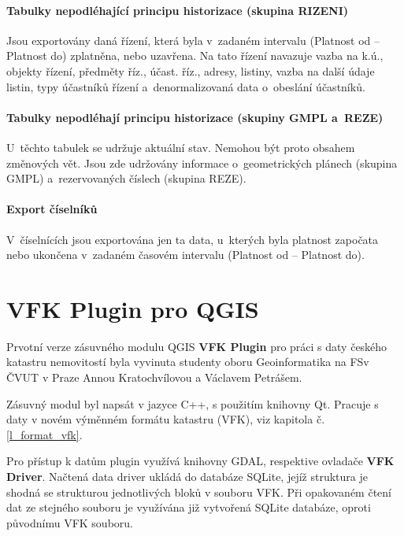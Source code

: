 \documentclass[a4paper,12pt,oneside]{book}
\begin{document}
\subsubsection{Tabulky nepodléhající principu historizace (skupina RIZENI)}

Jsou exportovány daná řízení, která byla v~zadaném intervalu (Platnost od -- Platnost do) zplatněna, nebo uzavřena. Na tato řízení navazuje vazba na k.ú., objekty řízení, předměty říz., účast. říz., adresy, listiny, vazba na další údaje listin, typy účastníků řízení a~denormalizovaná data o~obeslání účastníků. \cite{vfk_struktura}

\subsubsection{Tabulky nepodléhají principu historizace (skupiny GMPL a~REZE)}

U~těchto tabulek se udržuje aktuální stav. Nemohou být proto obsahem změnových vět. Jsou zde udržovány informace o~geometrických plánech (skupina GMPL) a~rezervovaných číslech (skupina REZE). \cite{vfk_struktura}

\subsubsection{Export číselníků}

V~číselnících jsou exportována jen ta data, u~kterých byla platnost započata nebo ukončena v~zadaném časovém intervalu (Platnost od -- Platnost do). \cite{vfk_struktura}


\clearpage
\chapter{VFK Plugin pro QGIS}
Prvotní verze zásuvného modulu QGIS \textbf{VFK Plugin} pro práci s daty českého katastru nemovitostí byla vyvinuta studenty oboru Geoinformatika na FSv ČVUT v Praze Annou Kratochvílovou a Václavem Petrášem. 

Zásuvný modul byl napsát v jazyce C++, s použitím knihovny Qt. Pracuje s daty v novém výměnném formátu katastru (VFK), viz kapitola č. \ref{l_format_vfk}. 

Pro přístup k datům plugin využívá knihovny GDAL, respektive ovladače \textbf{VFK Driver}. Načtená data driver ukládá do databáze SQLite, jejíž struktura je shodná se strukturou jednotlivých bloků v souboru VFK. Při opakovaném čtení dat ze stejného souboru je využívána již vytvořená SQLite databáze, oproti původnímu VFK souboru. 
\end{document}
